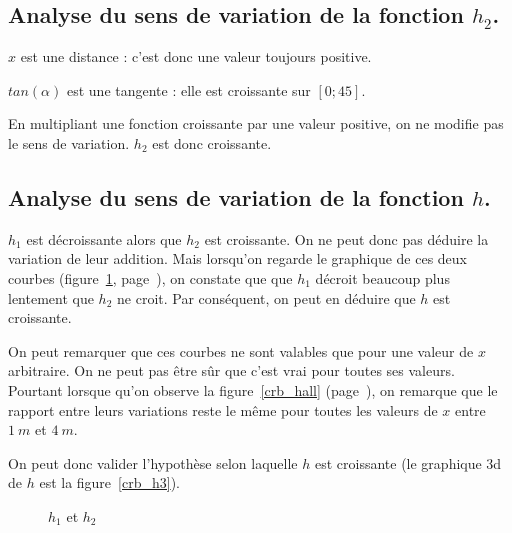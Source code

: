 \subsection{Analyse du sens de variation de la fonction $h_2$.}
$x$ est une distance : c'est donc une valeur toujours positive.

$tan(\alpha)$ est une tangente : elle est croissante sur $[0;45]$.

En multipliant une fonction croissante par une valeur positive, on ne modifie pas le sens de variation. $h_2$ est donc croissante.

\subsection{Analyse du sens de variation de la fonction $h$.}
$h_1$ est décroissante alors que $h_2$ est croissante. On ne peut donc pas déduire la variation de leur addition. Mais lorsqu'on regarde le graphique de ces deux courbes (figure~\ref{crb_hs}, page~\pageref{crb_hs}), on constate que que $h_1$ décroit beaucoup plus lentement que $h_2$ ne croit. Par conséquent, on peut en déduire que $h$ est croissante.

On peut remarquer que ces courbes ne sont valables que pour une valeur de $x$ arbitraire. On ne peut pas être sûr que c'est vrai pour toutes ses valeurs. Pourtant lorsque qu'on observe la figure~\ref{crb_hall} (page~\pageref{crb_hall}), on remarque que le rapport entre leurs variations reste le même pour toutes les valeurs de $x$ entre $1\ m$ et $4\ m$.

On peut donc valider l'hypothèse selon laquelle $h$ est croissante (le graphique 3d de $h$ est la figure~\ref{crb_h3}).

\begin{figure}
	\begin{center}
	\end{center}
	\caption{$h_1$ et $h_2$}
	\label{crb_hs}
\end{figure}

